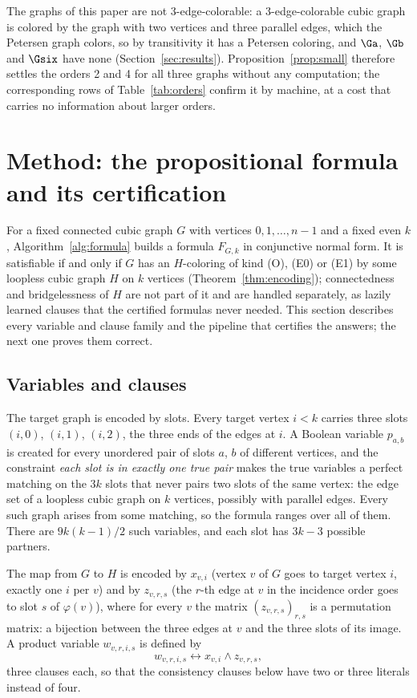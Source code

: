 The graphs of this paper are not 3-edge-colorable: a 3-edge-colorable cubic graph is colored by the graph with two vertices and three parallel
edges, which the Petersen graph colors, so by transitivity it has a Petersen coloring, and $\Ga$, $\Gb$ and $\Gsix$ have none (Section~\ref{sec:results}).
Proposition~\ref{prop:small} therefore settles the orders 2 and 4 for all three graphs without any computation; the corresponding rows of
Table~\ref{tab:orders} confirm it by machine, at a cost that carries no information about larger orders.

\section{Method: the propositional formula and its certification}\label{sec:method}

For a fixed connected cubic graph $G$ with vertices $0, 1, \dots, n-1$ and a fixed even $k$, Algorithm~\ref{alg:formula} builds a formula $F_{G,k}$ in
conjunctive normal form. It is satisfiable if and only if $G$ has an $H$-coloring of kind (O), (E0) or (E1) by some loopless cubic graph $H$ on $k$
vertices (Theorem~\ref{thm:encoding}); connectedness and bridgelessness of $H$ are not part of it and are handled separately, as lazily learned clauses
that the certified formulas never needed. This section describes every variable and clause family and the pipeline that certifies the answers; the next
one proves them correct.

\subsection{Variables and clauses}\label{sec:formula}

The target graph is encoded by slots. Every target vertex $i < k$ carries three slots $(i,0)$, $(i,1)$, $(i,2)$, the three ends of the edges at $i$. A Boolean
variable $p_{a,b}$ is created for every unordered pair of slots $a$, $b$ of different vertices, and the constraint \emph{each slot is in exactly one true pair}
makes the true variables a perfect matching on the $3k$ slots that never pairs two slots of the same vertex: the edge set of a loopless cubic graph on $k$ vertices,
possibly with parallel edges. Every such graph arises from some matching, so the formula ranges over all of them. There are $9k(k-1)/2$ such variables, and
each slot has $3k-3$ possible partners.

The map from $G$ to $H$ is encoded by $x_{v,i}$ (vertex $v$ of $G$ goes to target vertex $i$, exactly one $i$ per $v$) and by $z_{v,r,s}$ (the $r$-th edge at
$v$ in the incidence order goes to slot $s$ of $\varphi(v)$), where for every $v$ the matrix $(z_{v,r,s})_{r,s}$ is a permutation matrix: a bijection between the three edges at $v$ and
the three slots of its image. A product variable $w_{v,r,i,s}$ is defined by
\begin{equation}\label{eq:w}
w_{v,r,i,s} \leftrightarrow x_{v,i} \wedge z_{v,r,s},
\end{equation}
three clauses each, so that the consistency clauses below have two or three literals instead of four.

